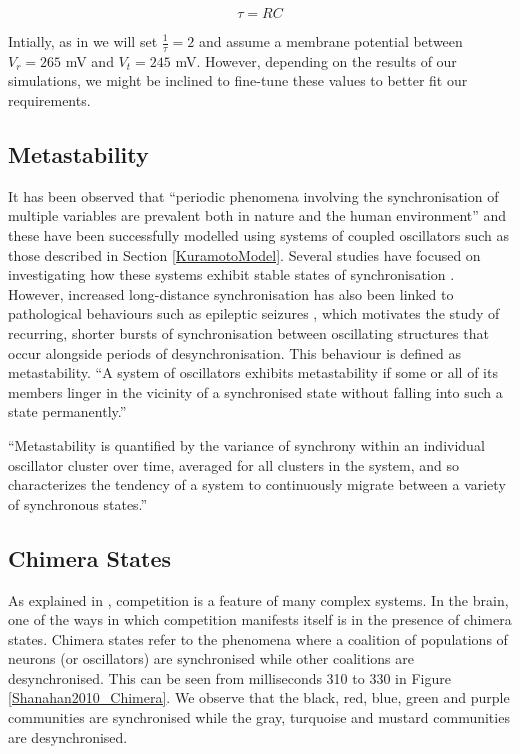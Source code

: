 \documentclass[a4paper,11pt]{article}
\begin{document}
\begin{equation} \label{eq:tau}
\tau = RC
\end{equation}

Intially, as in \cite{Bhowmik2013} we will set $\frac{1}{\tau} = 2$ and assume a membrane potential between $V_r = 265$ mV and $V_t = 245$ mV. However, depending on the results of our simulations, we might be inclined to fine-tune these values to better fit our requirements.

\subsection{Metastability}

It has been observed that ``periodic phenomena involving the synchronisation of multiple variables are prevalent both in nature and the human environment'' \cite{Shanahan2010} and these have been successfully modelled using systems of coupled oscillators such as those described in Section \ref{KuramotoModel}. Several studies have focused on investigating how these systems exhibit stable states of synchronisation \cite{Acebron2005}. However, increased long-distance synchronisation has also been linked to pathological behaviours such as epileptic seizures \cite{Arthuis2009}, which motivates the study of recurring, shorter bursts of synchronisation between oscillating structures that occur alongside periods of desynchronisation. This behaviour is defined as metastability. ``A system of oscillators exhibits metastability if some or all of its members linger in the vicinity of a synchronised state without falling into such a state permanently.'' \cite{Shanahan2010}


``Metastability is quantified by the variance of synchrony within an individual oscillator cluster over time, averaged for all clusters in the system, and so characterizes the tendency of a system to continuously migrate between a variety of synchronous states.'' \cite{Bhowmik2013}

\subsection{Chimera States}
\label{sec:bg:chi}

As explained in \cite{Shanahan2010}, competition is a feature of many complex systems. In the brain, one of the ways in which competition manifests itself is in the presence of chimera states. Chimera states refer to the phenomena where a coalition of populations of neurons (or oscillators) are synchronised while other coalitions are desynchronised. This can be seen from milliseconds 310 to 330 in Figure \ref{Shanahan2010_Chimera}. We observe that the black, red, blue, green and purple communities are synchronised while the gray, turquoise and mustard communities are desynchronised.
\end{document}
